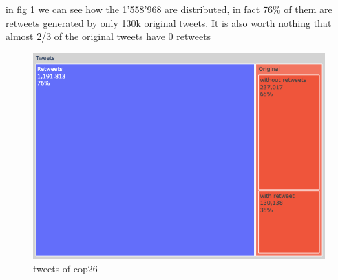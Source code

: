 in fig \ref{fig:cop26_tweets_stats} we can see how the 1'558'968 are distributed, in fact 76\% of them are retweets generated by only 130k original tweets. It is also worth nothing that almost 2/3 of the original tweets have 0 retweets 

\begin{figure}
    \centering
    \includegraphics[width=0.9\linewidth]{Chapter3/figures/treemap_tweets-1.png}
    \caption{tweets of cop26}
    \label{fig:cop26_tweets_stats}
\end{figure}








\ifpdf
    \graphicspath{{Chapter3/Figs/Raster/}{Chapter3/Figs/PDF/}{Chapter3/Figs/}}
\else
    \graphicspath{{Chapter3/Figs/Vector/}{Chapter3/Figs/}}
\fi

